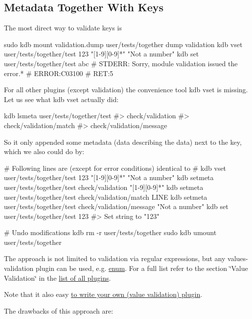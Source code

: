 \subsection*{Metadata Together With Keys}

The most direct way to validate keys is


\begin{DoxyCode}
sudo kdb mount validation.dump user/tests/together dump validation
kdb vset user/tests/together/test 123 "[1-9][0-9]*" "Not a number"
kdb set user/tests/together/test abc
# STDERR: Sorry, module validation issued the error.*
# ERROR:C03100
# RET:5
\end{DoxyCode}


For all other plugins (except {\ttfamily validation}) the convenience tool {\ttfamily kdb vset} is missing. Let us see what {\ttfamily kdb vset} actually did\+:


\begin{DoxyCode}
kdb lsmeta user/tests/together/test
#> check/validation
#> check/validation/match
#> check/validation/message
\end{DoxyCode}


So it only appended some metadata (data describing the data) next to the key, which we also could do by\+:


\begin{DoxyCode}
# Following lines are (except for error conditions) identical to
# kdb vset user/tests/together/test 123 "[1-9][0-9]*" "Not a number"
kdb setmeta user/tests/together/test check/validation "[1-9][0-9]*"
kdb setmeta user/tests/together/test check/validation/match LINE
kdb setmeta user/tests/together/test check/validation/message "Not a number"
kdb set user/tests/together/test 123
#> Set string to "123"

# Undo modifications
kdb rm -r user/tests/together
sudo kdb umount user/tests/together
\end{DoxyCode}


The approach is not limited to validation via regular expressions, but any values-\/validation plugin can be used, e.\+g. \hyperlink{md_src_plugins_enum_README_src_plugins_enum_README_md}{enum}. For a full list refer to the section \char`\"{}\+Value Validation\char`\"{} in the \hyperlink{src_plugins_README_md}{list of all plugins}.

Note that it also easy \hyperlink{doc_tutorials_plugins_md}{to write your own (value validation) plugin}.

The drawbacks of this approach are\+:


